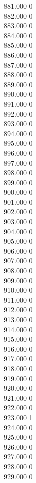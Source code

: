 { 881.000	0 \\
 882.000	0 \\
 883.000	0 \\
 884.000	0 \\
 885.000	0 \\
 886.000	0 \\
 887.000	0 \\
 888.000	0 \\
 889.000	0 \\
 890.000	0 \\
 891.000	0 \\
 892.000	0 \\
 893.000	0 \\
 894.000	0 \\
 895.000	0 \\
 896.000	0 \\
 897.000	0 \\
 898.000	0 \\
 899.000	0 \\
 900.000	0 \\
 901.000	0 \\
 902.000	0 \\
 903.000	0 \\
 904.000	0 \\
 905.000	0 \\
 906.000	0 \\
 907.000	0 \\
 908.000	0 \\
 909.000	0 \\
 910.000	0 \\
 911.000	0 \\
 912.000	0 \\
 913.000	0 \\
 914.000	0 \\
 915.000	0 \\
 916.000	0 \\
 917.000	0 \\
 918.000	0 \\
 919.000	0 \\
 920.000	0 \\
 921.000	0 \\
 922.000	0 \\
 923.000	1 \\
 924.000	0 \\
 925.000	0 \\
 926.000	0 \\
 927.000	0 \\
 928.000	0 \\
 929.000	0 \\
}
